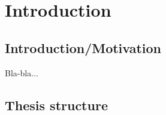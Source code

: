 \chapter{Introduction}\label{ch:intro}

\section{Introduction/Motivation}

Bla-bla...

\begin{comment}
Also, excuse me in advance for the extensive use of the second person form in 
the following chapters, as well as breaking the fourth wall between the writer 
and the reader. Although I tried to, I find it difficult to communicate the more 
\textit{humane} aspect of this thesis such as code decisions, pitfalls and 
shortcomings.  After all, there is "you" who reads this thesis and "I" who 
writes it and no amount of third person form can cover that.
\end{comment}

\section{Thesis structure}

